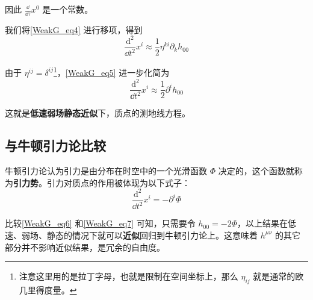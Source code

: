 因此 $\frac{\dd}{\dd\tau}x^0$ 是一个常数。

我们将\autoref{WeakG_eq4} 进行移项，得到
\begin{equation}\label{WeakG_eq5}
\frac{\mathrm{d}^2}{\dd t^2}x^i\approx\frac{1}{2}\eta^{ki}\partial_kh_{00}
\end{equation}

由于 $\eta^{ij}=\delta^{ij}$\footnote{注意这里用的是拉丁字母，也就是限制在空间坐标上，那么 $\eta_{ij}$ 就是通常的欧几里得度量。}，\autoref{WeakG_eq5} 进一步化简为
\begin{equation}\label{WeakG_eq6}
\frac{\mathrm{d}^2}{\dd t^2}x^i\approx\frac{1}{2}\partial^ih_{00}
\end{equation}

这就是\textbf{低速弱场静态近似}下，质点的测地线方程。

\subsection{与牛顿引力论比较}

牛顿引力论认为引力是由分布在时空中的一个光滑函数 $\Phi$ 决定的，这个函数就称为\textbf{引力势}。引力对质点的作用被体现为以下式子：
\begin{equation}\label{WeakG_eq7}
\frac{\mathrm{d}^2}{\dd t^2}x^i=-\partial^i\Phi
\end{equation}

比较\autoref{WeakG_eq6} 和\autoref{WeakG_eq7} 可知，只需要令 $h_{00}=-2\Phi$，以上结果在低速、弱场、静态的情况下就可以\textbf{近似}回归到牛顿引力论上。这意味着 $h^{\mu\nu}$ 的其它部分并不影响近似结果，是冗余的自由度。








